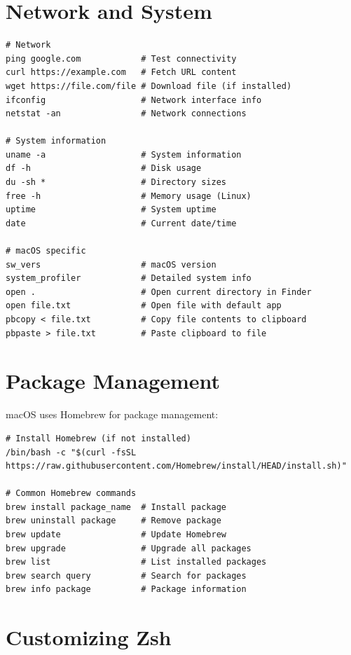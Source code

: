 \documentclass[11pt]{article}
\begin{document}
\section{Network and System}

\begin{lstlisting}
# Network
ping google.com            # Test connectivity
curl https://example.com   # Fetch URL content
wget https://file.com/file # Download file (if installed)
ifconfig                   # Network interface info
netstat -an                # Network connections

# System information
uname -a                   # System information
df -h                      # Disk usage
du -sh *                   # Directory sizes
free -h                    # Memory usage (Linux)
uptime                     # System uptime
date                       # Current date/time

# macOS specific
sw_vers                    # macOS version
system_profiler            # Detailed system info
open .                     # Open current directory in Finder
open file.txt              # Open file with default app
pbcopy < file.txt          # Copy file contents to clipboard
pbpaste > file.txt         # Paste clipboard to file
\end{lstlisting}

\section{Package Management}

macOS uses Homebrew for package management:

\begin{lstlisting}
# Install Homebrew (if not installed)
/bin/bash -c "$(curl -fsSL https://raw.githubusercontent.com/Homebrew/install/HEAD/install.sh)"

# Common Homebrew commands
brew install package_name  # Install package
brew uninstall package     # Remove package
brew update                # Update Homebrew
brew upgrade               # Upgrade all packages
brew list                  # List installed packages
brew search query          # Search for packages
brew info package          # Package information
\end{lstlisting}

\section{Customizing Zsh}
\end{document}

